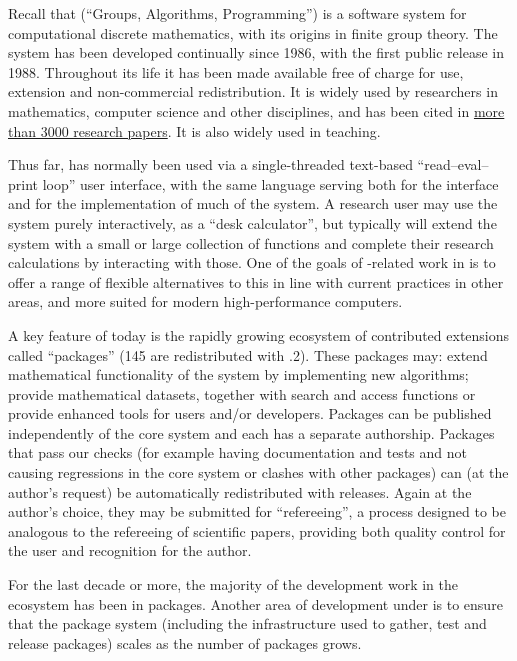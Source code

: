 Recall that \GAP (``Groups, Algorithms, Programming'') is a software system for
computational discrete mathematics, with its origins in finite group
theory. The system has been developed continually since 1986, with the
first public release in 1988. Throughout its life it has been made
available free of charge for use, extension and non-commercial
redistribution. It is widely used by researchers in mathematics,
computer science and other disciplines, and has been cited in
\href{https://www.gap-system.org/Doc/Bib/bib.html}{more than 3000
  research papers}. It is also widely used in teaching.

Thus far, \GAP has
normally been used via a single-threaded text-based ``read--eval--print loop'' user interface, with the
same \GAP language serving both for the interface and for the
implementation of much of the system. A research user 
may use the system purely interactively, as a ``desk calculator'', but
typically will extend the system with a small or large collection of
\GAP functions and complete their research calculations by interacting
with those. One of the goals of \GAP-related work in \ODK is to offer
a range of flexible alternatives to this in line with current
practices in other areas, and more suited for modern high-performance
computers.

A key feature of \GAP today is the rapidly growing ecosystem of
contributed extensions called ``packages'' (145 are redistributed with
.2). These packages may: extend mathematical functionality of
the system by implementing new algorithms; provide mathematical
datasets, together with search and access functions or provide
enhanced tools for users and/or developers. Packages can be published
independently of the core \GAP system and each has a separate
authorship. Packages that pass our checks (for example having
documentation and tests and not causing regressions in the core system
or clashes with other packages) can (at the author's request) be
automatically redistributed with \GAP releases. Again at the author's
choice, they may be
submitted for ``refereeing'', a process designed to be analogous to the
refereeing of scientific papers, providing both quality control for
the user and recognition for the author.

For the last decade or more, the majority of the
development work in the \GAP ecosystem has been in packages.
Another area of \GAP development under \ODK is to ensure
that the package system (including the infrastructure used to gather,
test and release packages) scales as the number of packages grows.


